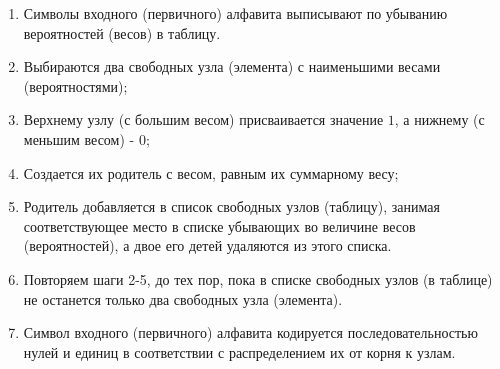 \begin{enumerate}
  \item Символы входного (первичного) алфавита выписывают по убыванию вероятностей (весов) в таблицу.
  \item Выбираются два свободных узла (элемента) с наименьшими весами (вероятностями);
  \item Верхнему узлу (с большим весом) присваивается значение $1$, а нижнему (с меньшим весом) - $0$;
  \item Создается их родитель с весом, равным их суммарному весу;
  \item Родитель добавляется в список свободных узлов (таблицу), занимая соответствующее место в списке убывающих во величине весов (вероятностей), а двое его детей удаляются из этого списка.
  \item Повторяем шаги 2-5, до тех пор, пока в списке свободных узлов (в таблице) не останется только два свободных узла (элемента).
  \item Символ входного (первичного) алфавита кодируется последовательностью нулей и единиц в соответствии с распределением их от корня к узлам.
\end{enumerate}

